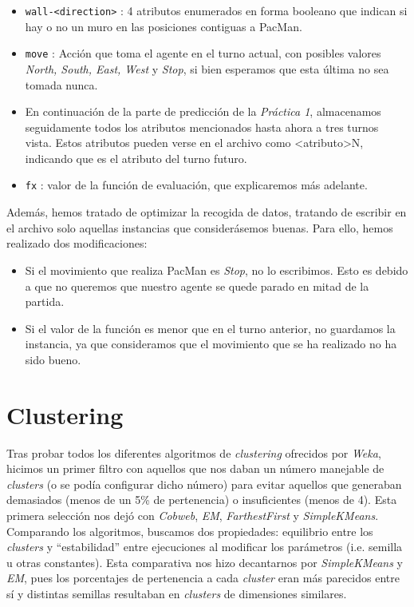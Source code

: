 \documentclass[12pt]{article}
\begin{document}
\begin{itemize}
    \item \texttt{wall-\textless direction\textgreater} : 4 atributos enumerados en forma booleano que indican si hay o no un muro en las posiciones contiguas a PacMan.
    \item \texttt{move} : Acción que toma el agente en el turno actual, con posibles valores \textit{North, South, East, West} y \textit {Stop}, si bien esperamos que esta última no sea tomada nunca.
    \item En continuación de la parte de predicción de la \textit{Práctica 1}, almacenamos seguidamente todos los atributos mencionados hasta ahora a tres turnos vista. Estos atributos pueden verse en el archivo como \textless atributo\textgreater N, indicando que es el atributo del turno futuro.
    \item \texttt{fx} : valor de la función de evaluación, que explicaremos más adelante.
\end{itemize}

Además, hemos tratado de optimizar la recogida de datos, tratando de escribir en el archivo solo aquellas instancias que considerásemos buenas. Para ello, hemos realizado dos modificaciones:
\begin{itemize}
    \item Si el movimiento que realiza PacMan es \textit{Stop}, no lo escribimos. Esto es debido a que no queremos que nuestro agente se quede parado en mitad de la partida.
    \item Si el valor de la función es menor que en el turno anterior, no guardamos la instancia, ya que consideramos que el movimiento que se ha realizado no ha sido bueno.
\end{itemize}

\section{Clustering}


Tras probar todos los diferentes algoritmos de \textit{clustering} ofrecidos por \textit{Weka}, hicimos un primer filtro con aquellos que nos daban un número manejable de \textit{clusters} (o se podía configurar dicho número) para evitar aquellos que generaban demasiados (menos de un 5\% de pertenencia) o insuficientes (menos de 4). Esta primera selección nos dejó con \textit{Cobweb}, \textit{EM}, \textit{FarthestFirst} y \textit{SimpleKMeans}. Comparando los algoritmos, buscamos dos propiedades: equilibrio entre los \textit{clusters} y ``estabilidad'' entre ejecuciones al modificar los parámetros (i.e. semilla u otras constantes). Esta comparativa nos hizo decantarnos por \textit{SimpleKMeans} y \textit{EM}, pues los porcentajes de pertenencia a cada \textit{cluster} eran más parecidos entre sí y distintas semillas resultaban en \textit{clusters} de dimensiones similares.
\end{document}

